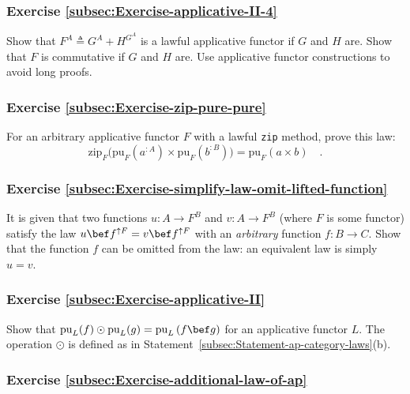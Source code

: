 \subsubsection{Exercise \label{subsec:Exercise-applicative-II-4}\ref{subsec:Exercise-applicative-II-4}}

Show that $F^{A}\triangleq G^{A}+H^{G^{A}}$ is a lawful applicative
functor if $G$ and $H$ are. Show that $F$ is commutative if $G$
and $H$ are. Use applicative functor constructions to avoid long
proofs.

\subsubsection{Exercise \label{subsec:Exercise-zip-pure-pure}\ref{subsec:Exercise-zip-pure-pure}}

For an arbitrary applicative functor $F$ with a lawful \lstinline!zip!
method, prove this law:
\[
\text{zip}_{F}\big(\text{pu}_{F}(a^{:A})\times\text{pu}_{F}(b^{:B})\big)=\text{pu}_{F}(a\times b)\quad.
\]


\subsubsection{Exercise \label{subsec:Exercise-simplify-law-omit-lifted-function}\ref{subsec:Exercise-simplify-law-omit-lifted-function}}

It is given that two functions $u:A\rightarrow F^{B}$ and $v:A\rightarrow F^{B}$
(where $F$ is some functor) satisfy the law $u\bef f^{\uparrow F}=v\bef f^{\uparrow F}$
with an \emph{arbitrary} function $f:B\rightarrow C$. Show that the
function $f$ can be omitted from the law: an equivalent law is simply
$u=v$.

\subsubsection{Exercise \label{subsec:Exercise-applicative-II}\ref{subsec:Exercise-applicative-II}}

Show that $\text{pu}_{L}(f)\odot\text{pu}_{L}(g)=\text{pu}_{L}\left(f\bef g\right)$
for an applicative functor $L$. The operation $\odot$ is defined
as in Statement~\ref{subsec:Statement-ap-category-laws}(b).

\subsubsection{Exercise \label{subsec:Exercise-additional-law-of-ap}\ref{subsec:Exercise-additional-law-of-ap}}

